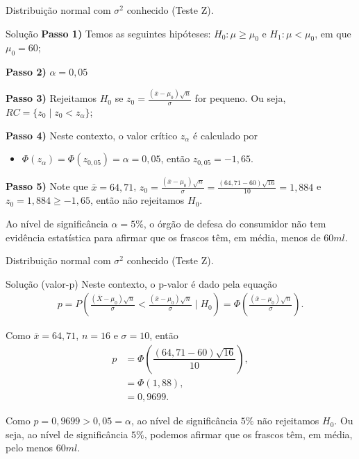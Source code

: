 \documentclass[8pt]{beamer}
\begin{document}
\begin{frame}{Distribuição normal com $\sigma^2$ conhecido (Teste Z).}

\large
\begin{block}{Solução}
	 \textbf{Passo 1)} Temos as seguintes hipóteses: $H_0: \mu \geq \mu_0$ e $H_1: \mu < \mu_0$, em que $\mu_0=60$;

\textbf{Passo 2)} $\alpha = 0,05$

\textbf{Passo 3)} Rejeitamos $H_0$ se $z_0 = \frac{(\bar{x} - \mu_0)\sqrt{n}}{\sigma}$ for pequeno. Ou seja, $RC = \{z_0 \mid z_0 < z_{\alpha}\}$;

\textbf{Passo 4)} Neste contexto, o valor crítico $z_{\alpha}$ é calculado por
\begin{itemize}
	\item $\Phi\left(z_{\alpha}\right) = \Phi\left( z_{0,05} \right) =  \alpha = 0,05$, então $z_{0,05} = -1,65$.
\end{itemize}
\vfill

\textbf{Passo 5)} Note que $\bar{x}=64,71$, $z_0 = \frac{(\bar{x} - \mu_0)\sqrt{n}}{\sigma} = \frac{(64,71 - 60)\sqrt{16}}{10} = 1,884$ e $z_0 = 1,884 \geq -1,65$, então não rejeitamos $H_0$.
\vfill

Ao nível de significância $\alpha=5\%$, o órgão de defesa do consumidor não tem evidência estatística para afirmar que os frascos têm, em média, menos de $60ml$.	
\end{block}
\normalsize
	
\end{frame}

\begin{frame}{Distribuição normal com $\sigma^2$ conhecido (Teste Z).}

\begin{block}{Solução (valor-p)}
	Neste contexto, o p-valor é dado pela equação
	\begin{align*}
	p = P\left( \frac{(\bar{X} - \mu_0)\sqrt{n}}{\sigma} < \frac{(\bar{x} - \mu_0)\sqrt{n}}{\sigma} \mid H_0 \right)	= \Phi \left( \frac{(\bar{x} - \mu_0)\sqrt{n}}{\sigma} \right).
	\end{align*}
	\vfill
	
	Como $\bar{x}=64,71$, $n = 16$ e $\sigma = 10$, então
	\begin{align*}
	p &= \Phi \left( \dfrac{(64,71 - 60) \sqrt{16}}{10} \right),\\
	&= \Phi(1,88),\\
	&= 0,9699.
	\end{align*}
	
	Como $p=0,9699 > 0,05 = \alpha$, ao nível de significância $5\%$ não rejeitamos $H_0$. Ou seja, ao nível de significância $5\%$, podemos afirmar que os frascos têm, em média, pelo menos $60ml$.
		
\end{block}


\end{frame}
\end{document}
